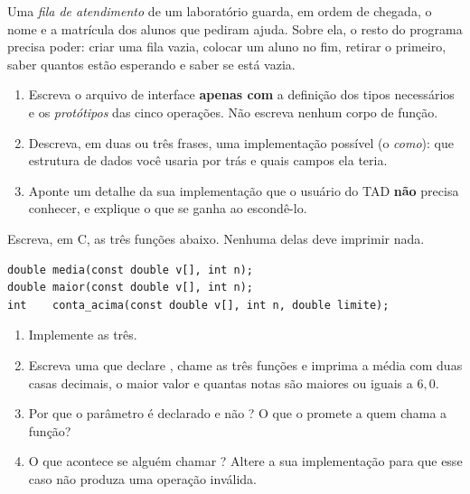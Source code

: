 \documentclass[11pt,a4paper]{article}
\begin{document}
Uma \emph{fila de atendimento} de um laboratório guarda, em ordem de chegada, o
nome e a matrícula dos alunos que pediram ajuda. Sobre ela, o resto do programa
precisa poder: criar uma fila vazia, colocar um aluno no fim, retirar o primeiro,
saber quantos estão esperando e saber se está vazia.

\begin{enumerate}[label=(\alph*),leftmargin=1.8em,itemsep=1pt]
  \item Escreva o arquivo de interface  \textbf{apenas com} a definição
        dos tipos necessários e os \emph{protótipos} das cinco operações. Não
        escreva nenhum corpo de função.
  \item Descreva, em duas ou três frases, uma implementação possível (o \emph{como}):
        que estrutura de dados você usaria por trás e quais campos ela teria.
  \item Aponte um detalhe da sua implementação que o usuário do TAD \textbf{não}
        precisa conhecer, e explique o que se ganha ao escondê-lo.
\end{enumerate}

Escreva, em C, as três funções abaixo. Nenhuma delas deve imprimir nada.

\begin{lstlisting}
double media(const double v[], int n);
double maior(const double v[], int n);
int    conta_acima(const double v[], int n, double limite);
\end{lstlisting}

\begin{enumerate}[label=(\alph*),leftmargin=1.8em,itemsep=1pt]
  \item Implemente as três.
  \item Escreva uma  que declare ,
        chame as três funções e imprima a média com duas casas decimais, o maior
        valor e quantas notas são maiores ou iguais a $6{,}0$.
  \item Por que o parâmetro é declarado  e não ?
        O que o  promete a quem chama a função?
  \item O que acontece se alguém chamar ? Altere a sua
        implementação para que esse caso não produza uma operação inválida.
\end{enumerate}
\end{document}
